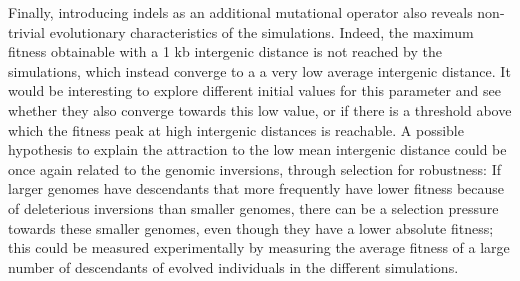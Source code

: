 Finally, introducing indels as an additional mutational operator also reveals non-trivial evolutionary characteristics of the simulations.
Indeed, the maximum fitness obtainable with a 1 kb intergenic distance is not reached by the simulations, which instead converge to a a very low average intergenic distance.
It would be interesting to explore different initial values for this parameter and see whether they also converge towards this low value, or if there is a threshold above which the fitness peak at high intergenic distances is reachable.
A possible hypothesis to explain the attraction to the low mean intergenic distance could be once again related to the genomic inversions, through selection for robustness: If larger genomes have descendants that more frequently have lower fitness because of deleterious inversions than smaller genomes, there can be a selection pressure towards these smaller genomes, even though they have a lower absolute fitness; this could be measured experimentally by measuring the average fitness of a large number of descendants of evolved individuals in the different simulations.
